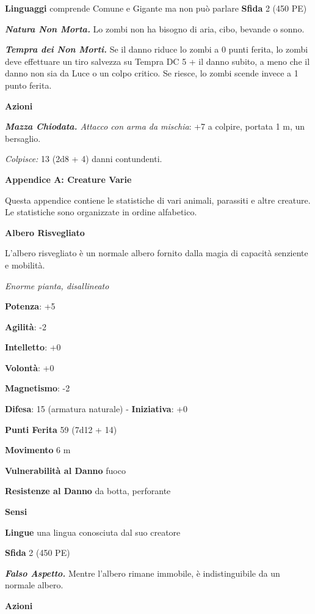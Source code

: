 \begin{multicols}{2}
\textbf{Linguaggi} comprende Comune e Gigante ma non può parlare
\textbf{Sfida} 2 (450 PE)\smallskip

\emph{\textbf{Natura Non Morta.}} Lo zombi non ha bisogno di aria, cibo,
bevande o sonno.

\emph{\textbf{Tempra dei Non Morti.}} Se il danno riduce lo zombi a 0
punti ferita, lo zombi deve effettuare un tiro salvezza su Tempra
DC 5 + il danno subito, a meno che il danno non sia da Luce o un colpo
critico. Se riesce, lo zombi scende invece a 1 punto ferita.

\smallskip\textbf{Azioni}

\emph{\textbf{Mazza Chiodata.} Attacco con arma da mischia}: +7 a
colpire, portata 1 m, un bersaglio.

\emph{Colpisce:} 13 (2d8 + 4) danni contundenti.



\textbf{Appendice A: Creature Varie}

Questa appendice contiene le statistiche di vari animali, parassiti e
altre creature. Le statistiche sono organizzate in ordine alfabetico.

\textbf{Albero Risvegliato}

L'albero risvegliato è un normale albero fornito dalla magia di capacità
senziente e mobilità.

\emph{Enorme pianta, disallineato}

\textbf{Potenza}: +5

\textbf{Agilità}: -2

\textbf{Intelletto}: +0

\textbf{Volontà}: +0

\textbf{Magnetismo}: -2

\textbf{Difesa}: 15 (armatura naturale) - \textbf{Iniziativa}: +0

\textbf{Punti Ferita} 59 (7d12 + 14)

\textbf{Movimento} 6 m

\textbf{Vulnerabilità al Danno} fuoco

\textbf{Resistenze al Danno} da botta, perforante

\textbf{Sensi} 

\textbf{Lingue} una lingua conosciuta dal suo creatore

\textbf{Sfida} 2 (450 PE)\smallskip

\emph{\textbf{Falso Aspetto.}} Mentre l'albero rimane immobile, è
indistinguibile da un normale albero.

\smallskip\textbf{Azioni}


\end{multicols}
